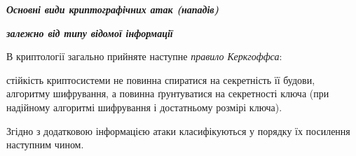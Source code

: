 \bigskip


\bigskip

{\centering\bfseries\itshape
Основні види криптографічних атак (нападів)
\par}

{\centering\bfseries\itshape
 залежно від типу відомої інформації
\par}


\bigskip


\bigskip

В криптології загально прийняте  наступне \textit{правило Керкгоффса}: 

 стійкість криптосистеми не повинна спиратися на секретність її будови,
алгоритму шифрування,  а повинна ґрунтуватися на секретності ключа (при
надійному алгоритмі шифрування і достатньому розмірі ключа). 

Згідно з додатковою інформацією атаки класифікуються у порядку їх посилення
наступним чином.

